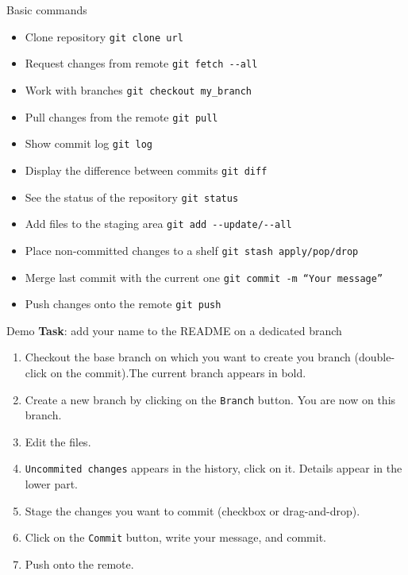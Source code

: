 \documentclass[compress,english,aspectratio=1610]{beamer}
\let\olditem\item
\renewcommand{\item}{\setlength{\itemsep}{\fill}\olditem}
\begin{document}
\begin{frame}{Basic commands}
	\begin{itemize}
		\item Clone repository \hfill{\tt git clone url}
		\item Request changes from remote \hfill {\tt git fetch -{}-all}
		\item Work with branches \hfill {\tt git checkout my\_branch}
		\item Pull changes from the remote \hfill {\tt git pull}
		\item Show commit log \hfill  {\tt git log}
		\item Display the difference between commits \hfill {\tt git diff}
		\item See the status of the repository \hfill {\tt git status}
		\item Add files to the staging area \hfill {\tt git add -{}-update/-{}-all}
		\item Place non-committed changes to a shelf \hfill {\tt git stash apply/pop/drop}
		\item Merge last commit with the current one \hfill {\tt git commit -m ``Your message''}
		\item Push changes onto the remote \hfill {\tt git push}
	\end{itemize}
\end{frame}

\begin{frame}{Demo}
	\textbf{Task}: add your name to the README on a dedicated branch
		\begin{enumerate}
			\item Checkout the base branch on which you want to create you branch (double-click on the commit).The current branch appears in bold.
			\item Create a new branch by clicking on the {\tt Branch} button. You are now on this branch.
			\item Edit the files.
			\item {\tt Uncommited changes} appears in the history, click on it. Details appear in the lower part.
			\item Stage the changes you want to commit (checkbox or drag-and-drop).
			\item Click on the {\tt Commit} button, write your message, and commit.
			\item Push onto the remote.
    		\end{enumerate}
\end{frame}
\end{document}
